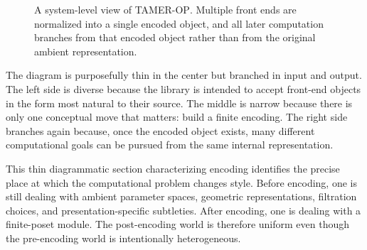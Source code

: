 \documentclass[11pt]{article}
\newcommand{\TAMER}{\textsc{TAMER-OP}}
\theoremstyle{definition}
\theoremstyle{remark}
\begin{document}
\begin{figure}[h]
\caption{A system-level view of \TAMER.  Multiple front ends are normalized into a single encoded object, and all later computation branches from that encoded object rather than from the original ambient representation.}
\label{fig:system-overview}
\end{figure}

The diagram is purposefully thin in the center but branched in input and output.  The left side is diverse because the library is intended to accept front-end objects in the form most natural to their source.  The middle is narrow because there is only one conceptual move that matters: build a finite encoding.  The right side branches again because, once the encoded object exists, many different computational goals can be pursued from the same internal representation.

This thin diagrammatic section characterizing encoding identifies the precise place at which the computational problem changes style. Before encoding, one is still dealing with ambient parameter spaces, geometric representations, filtration choices, and presentation-specific subtleties.  After encoding, one is dealing with a finite-poset module.  The post-encoding world is therefore uniform even though the pre-encoding world is intentionally heterogeneous.
\end{document}
